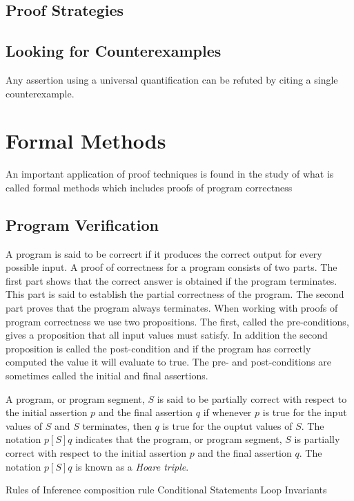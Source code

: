 \subsection {Proof Strategies}
  \subsection {Looking for Counterexamples}
Any assertion using a universal quantification can be refuted by citing a single counterexample.


\section{Formal Methods}
An important application of proof techniques is found in the study of what is called formal methods which includes proofs of program correctness


  \subsection {Program Verification}A program is said to be correcrt if it produces the correct output for every possible input. A proof of correctness for a program consists of two parts. The first part shows that the correct answer is obtained if the program terminates. This part is said to establish the partial correctness of the program. The second part proves that the program always terminates. When working with proofs of program correctness we use two propositions. The first, called the pre-conditions, gives a proposition that all input values must satisfy. In addition the second proposition is called the post-condition and if the program has correctly computed the value it will evaluate to true. The pre- and post-conditions are sometimes called the initial and final assertions.

\begin{definition}
A program, or program segment, $S$ is said to be partially correct with respect to the initial assertion $p$ and the final assertion $q$ if whenever $p$ is true for the input values of $S$ and $S$ terminates, then $q$ is true for the ouptut values of $S$. The notation $p[S]q$ indicates that the program, or program segment, $S$ is partially correct with respect to the initial assertion $p$ and the final assertion $q$. The notation $p[S]q$ is known as a \textit{Hoare triple}.
\end{definition}

 {Rules of Inference}
composition rule
   {Conditional Statements}
  {Loop Invariants}
        
\newpage




